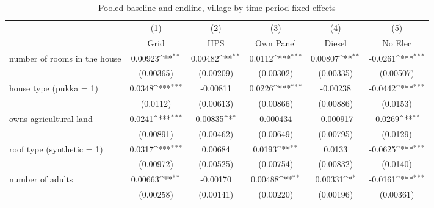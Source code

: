 \begin{table}[htbp]\centering
\def\sym#1{\ifmmode^{#1}\else\(^{#1}\)\fi}
\caption{Pooled baseline and endline, village by time period fixed effects \label{tab: LABEL}}
\begin{tabular*}{1.0\hsize}{@{\hskip\tabcolsep\extracolsep\fill}l*{5}{c}}
\toprule
                                &\multicolumn{1}{c}{(1)}&\multicolumn{1}{c}{(2)}&\multicolumn{1}{c}{(3)}&\multicolumn{1}{c}{(4)}&\multicolumn{1}{c}{(5)}\\
                                &\multicolumn{1}{c}{Grid}&\multicolumn{1}{c}{HPS}&\multicolumn{1}{c}{Own Panel}&\multicolumn{1}{c}{Diesel}&\multicolumn{1}{c}{No Elec}\\
\midrule
number of rooms in the house    &     0.00923\sym{**} &     0.00482\sym{**} &      0.0112\sym{***}&     0.00807\sym{**} &     -0.0261\sym{***}\\
                                &   (0.00365)         &   (0.00209)         &   (0.00302)         &   (0.00335)         &   (0.00507)         \\
\addlinespace
house type (pukka = 1)          &      0.0348\sym{***}&    -0.00811         &      0.0226\sym{***}&    -0.00238         &     -0.0442\sym{***}\\
                                &    (0.0112)         &   (0.00613)         &   (0.00866)         &   (0.00886)         &    (0.0153)         \\
\addlinespace
owns agricultural land          &      0.0241\sym{***}&     0.00835\sym{*}  &    0.000434         &   -0.000917         &     -0.0269\sym{**} \\
                                &   (0.00891)         &   (0.00462)         &   (0.00649)         &   (0.00795)         &    (0.0129)         \\
\addlinespace
roof type (synthetic = 1)       &      0.0317\sym{***}&     0.00684         &      0.0193\sym{**} &      0.0133         &     -0.0625\sym{***}\\
                                &   (0.00972)         &   (0.00525)         &   (0.00754)         &   (0.00832)         &    (0.0140)         \\
\addlinespace
number of adults                &     0.00663\sym{**} &    -0.00170         &     0.00488\sym{**} &     0.00331\sym{*}  &     -0.0161\sym{***}\\
                                &   (0.00258)         &   (0.00141)         &   (0.00220)         &   (0.00196)         &   (0.00361)         \\

\end{tabular*}
\end{table}
